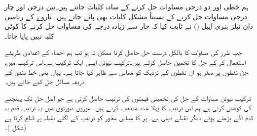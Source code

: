 ہم خطی اور دو درجی مساوات حل کرنے کے سادہ کلیات جانتے ہیں۔تین درجی اور چار درجی مساوات حل کرنے کے نسبتاً مشکل کلیات بھی پائے جاتے ہیں۔ ناروے کے ریاضی دان نیلز ہنری ایبل () نے ثابت کیا کہ  چار سے زیادہ درجے کی مساوات حل کرنے کا کوئی کلیہ نہیں پایا جاتا۔

جب  طرز کی مساوات کا بالکل درست حل حاصل کرنا ممکن نہ ہو تب ہم احصاء کے اعدادی طریقے  استعمال کر کے  حل کا  تخمین حاصل کرتے ہیں۔ترکیب نیوٹن ایسی ایک ترکیب ہے۔اس ترکیب میں، جن نقطوں پر  صفر ہو ان نقطوں کے نزدیک  کو مماس سے ظاہر کیا جاتا ہے۔ یہاں بھی خط بندی کے ذریعہ مسائل حل کیے جاتے ہیں۔

ترکیب نیوٹن مساوات  کے حل کی تخمینی قیمتوں کی ترتیب حاصل کرتی ہے جو اصل حل تک پہنچنے کی کوشش کرتی ہے۔ہم اس ترتیب کا پہلا عدد  منتخب کرتے ہیں۔ موزوں صورتوں میں یہ ترتیب قدم بہ قدم آگے بڑھتے ہوئے دیگر نقطے دیتی ہے۔   پر  کا مماس   محور  کو ترتیب کے اگلے نقطہ  پر قطع کرتا ہے (شکل )۔
